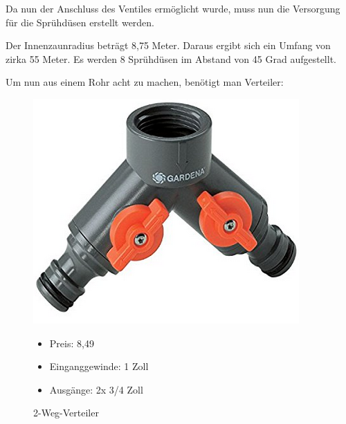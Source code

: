 Da nun der Anschluss des Ventiles ermöglicht wurde, muss nun die Versorgung für die Sprühdüsen erstellt werden. 

Der Innenzaunradius beträgt 8,75 Meter. Daraus ergibt sich ein Umfang von zirka 55 Meter. Es werden 8 Sprühdüsen im Abstand von 45 Grad aufgestellt. 

\newpage
Um nun aus einem Rohr acht zu machen, benötigt man Verteiler:

\begin{figure}[H]
\begin{minipage}[t]{0.45\textwidth}
\includegraphics[width=\textwidth]{fig/Gardena2Weg}
\caption{2-Weg-Verteiler}

\begin{itemize}
	\item{Preis: 8,49\textsf{\texteuro} \cite{preis2Weg}}
	\item{Einganggewinde: 1 Zoll}
	\item{Ausgänge: 2x 3/4 Zoll}
\end{itemize}

\end{minipage}
\hspace{0.1\textwidth}
\begin{minipage}[t]{0.45\textwidth}


\end{minipage}
\end{figure}
